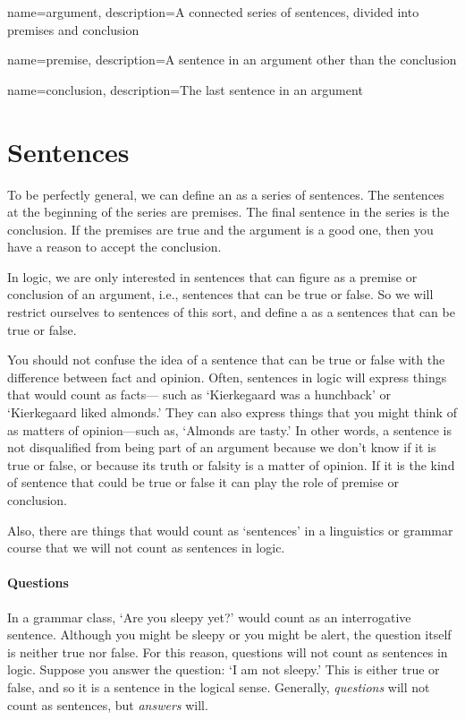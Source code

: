 {
name=argument,
description={A connected series of sentences, divided into \gls{premise}s and \gls{conclusion}}
}

{
name=premise,
description={A sentence in an \gls{argument} other than the \gls{conclusion}}
}

{
name=conclusion,
description={The last sentence in an \gls{argument}}
}


\section{Sentences}
\label{intro.sentences}

To be perfectly general, we can define an  as a series of sentences. The sentences at the beginning of the series are premises. The final sentence in the series is the conclusion. If the premises are true and the argument is a good one, then you have a reason to accept the conclusion.

In logic, we are only interested in sentences that can figure as a premise or conclusion of an argument, i.e., sentences that can be true or false.  So we will restrict ourselves to sentences of this sort, and define a  as a sentences that can be true or false.

You should not confuse the idea of a sentence that can be true or false with the difference between fact and opinion. Often, sentences in logic will express things that would count as facts--- such as `Kierkegaard was a hunchback' or `Kierkegaard liked almonds.' They can also express things that you might think of as matters of opinion---such as, `Almonds are tasty.' In other words, a sentence is not disqualified from being part of an argument because we don't know if it is true or false, or because its truth or falsity is a matter of opinion. If it is the kind of sentence that could be true or false it can play the role of premise or conclusion.

Also, there are things that would count as `sentences' in a linguistics or grammar course that we will not count as sentences in logic.

\paragraph{Questions} In a grammar class, `Are you sleepy yet?' would count as an interrogative sentence. Although you might be sleepy or you might be alert, the question itself is neither true nor false. For this reason, questions will not count as sentences in logic. Suppose you answer the question: `I am not sleepy.' This is either true or false, and so it is a sentence in the logical sense. Generally, \emph{questions} will not count as sentences, but \emph{answers} will. 

